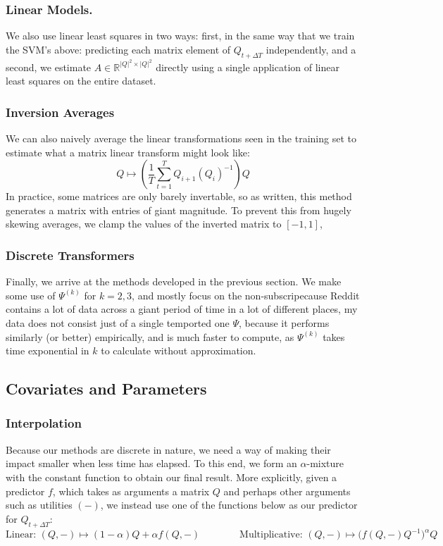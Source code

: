 \documentclass{article}
\theoremstyle{definition}
\begin{document}
	\subsubsection{Linear Models.}
	We also use linear least squares in two ways: first, in the same way that we train the SVM's above: predicting each matrix element of $Q_{t + \Delta T}$ independently, and a second, we estimate $A \in \mathbb{R}^{|Q|^2 \times |Q|^2}$ directly using a single application of linear least squares on the entire dataset.
	
	\subsubsection{Inversion Averages} We can also naively average the linear transformations seen in the training set to estimate what a matrix linear transform might look like:
	\[ Q \mapsto \left(\frac{1}{T}\sum_{t = 1}^T Q_{i+1} (Q_i)^{-1} \right)Q \]
	In practice, some matrices are only barely invertable, so as written, this method generates a matrix with entries of giant magnitude. To prevent this from hugely skewing averages, we clamp the values of the inverted matrix to $[-1,1]$,  
	
	\subsubsection{Discrete Transformers} Finally, we arrive at the methods developed in the previous section. We make some use of $\Psi^{(k)}$ for $k= 2,3$, and mostly focus on the non-subscripecause Reddit contains a lot of data across a giant period of time in a lot of different places, my data does not consist just of a single temported one $\Psi$, because it performs similarly (or better) empirically, and is much faster to compute, as $\Psi^{(k)}$ takes time exponential in $k$ to calculate without approximation.
	
	\subsection{Covariates and Parameters}
	\subsubsection{Interpolation} 
	Because our methods are discrete in nature, we need a way of making their impact smaller when less time has elapsed. To this end, we form an $\alpha$-mixture with the constant function to obtain our final result. More explicitly, given a predictor $f$, which takes as arguments a matrix $Q$ and perhaps other arguments such as utilities $(-)$, we instead use one of the functions below as our predictor for $Q_{t + \Delta T}$:
	\[\text{Linear: } (Q, -) \mapsto (1-\alpha) Q + \alpha f(Q,-) \qquad\qquad 
		\text{Multiplicative: } (Q,-) \mapsto \Big(f(Q,-)Q^{-1}\Big)^\alpha Q \]
	
\end{document}
